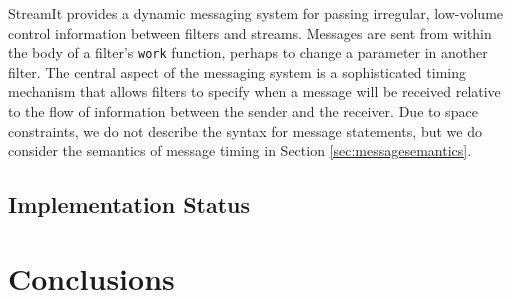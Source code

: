\documentclass{sig-alternate}
\begin{document}
StreamIt provides a dynamic messaging system for passing irregular,
low-volume control information between filters and streams.  Messages
are sent from within the body of a filter's {\tt work} function,
perhaps to change a parameter in another filter.  The central aspect
of the messaging system is a sophisticated timing mechanism that
allows filters to specify when a message will be received relative to
the flow of information between the sender and the receiver.  Due to
space constraints, we do not describe the syntax for message
statements, but we do consider the semantics of message timing in
Section \ref{sec:messagesemantics}.

\subsection{Implementation Status}

\section{Conclusions}
\end{document}
